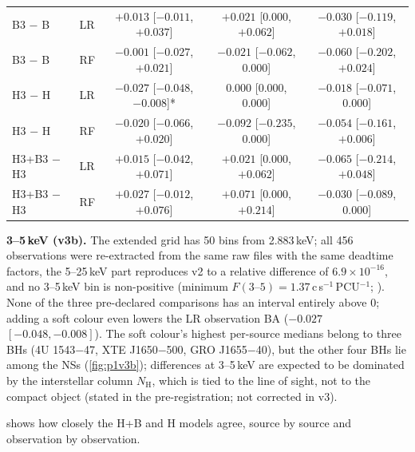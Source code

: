 \begin{table}[htbp]
\begin{tabular}{@{}llccc@{}}
B3 $-$ B & LR & $+0.013$ [$-0.011$, $+0.037$] & $+0.021$ [$0.000$, $+0.062$] & $-0.030$ [$-0.119$, $+0.018$] \\
B3 $-$ B & RF & $-0.001$ [$-0.027$, $+0.021$] & $-0.021$ [$-0.062$, $0.000$] & $-0.060$ [$-0.202$, $+0.024$] \\
H3 $-$ H & LR & $-0.027$ [$-0.048$, $-0.008$]* & $0.000$ [$0.000$, $0.000$] & $-0.018$ [$-0.071$, $0.000$] \\
H3 $-$ H & RF & $-0.020$ [$-0.066$, $+0.020$] & $-0.092$ [$-0.235$, $0.000$] & $-0.054$ [$-0.161$, $+0.006$] \\
H3+B3 $-$ H3 & LR & $+0.015$ [$-0.042$, $+0.071$] & $+0.021$ [$0.000$, $+0.062$] & $-0.065$ [$-0.214$, $+0.048$] \\
H3+B3 $-$ H3 & RF & $+0.027$ [$-0.012$, $+0.076$] & $+0.071$ [$0.000$, $+0.214$] & $-0.030$ [$-0.089$, $0.000$] \\
\bottomrule
\end{tabular}
\end{table}

\textbf{3--5\,keV (v3b).} The extended grid has 50 bins from 2.883\,keV; all 456 observations were re-extracted from the same
raw files with the same deadtime factors, the 5--25\,keV part reproduces v2 to a relative difference of $6.9\times10^{-16}$,
and no 3--5\,keV bin is non-positive (minimum $F(3\text{--}5)=1.37$\,c\,s$^{-1}$\,PCU$^{-1}$;
). None of the three pre-declared comparisons has an interval entirely above
0; adding a soft colour even lowers the LR observation BA ($-0.027$ $[-0.048,-0.008]$). The soft colour's highest
per-source medians belong to three BHs (4U 1543$-$47, XTE J1650$-$500, GRO J1655$-$40), but the other four BHs lie among
the NSs (\cref{fig:p1v3b}); differences at 3--5\,keV are expected to be dominated by the interstellar column $N_\mathrm{H}$,
which is tied to the line of sight, not to the compact object (stated in the pre-registration; not corrected in v3).

 shows how closely the H+B and H models agree, source by source and observation by observation.

